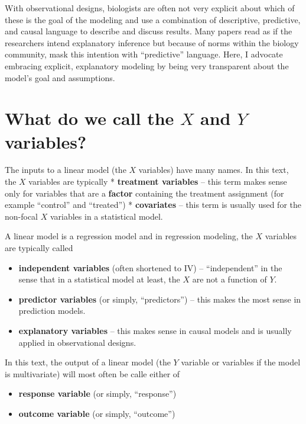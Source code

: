 \documentclass[]{book}
\providecommand{\tightlist}{%
  \setlength{\itemsep}{0pt}\setlength{\parskip}{0pt}}
\begin{document}
With observational designs, biologists are often not very explicit about which of these is the goal of the modeling and use a combination of descriptive, predictive, and causal language to describe and discuss results. Many papers read as if the researchers intend explanatory inference but because of norms within the biology community, mask this intention with ``predictive'' language. Here, I advocate embracing explicit, explanatory modeling by being very transparent about the model's goal and assumptions.

\hypertarget{what-do-we-call-the-x-and-y-variables}{%
\section{\texorpdfstring{What do we call the \(X\) and \(Y\) variables?}{What do we call the X and Y variables?}}\label{what-do-we-call-the-x-and-y-variables}}

The inputs to a linear model (the \(X\) variables) have many names. In this text, the \(X\) variables are typically
* \textbf{treatment variables} -- this term makes sense only for variables that are a \textbf{factor} containing the treatment assignment (for example ``control'' and ``treated'')
* \textbf{covariates} -- this term is usually used for the non-focal \(X\) variables in a statistical model.

A linear model is a regression model and in regression modeling, the \(X\) variables are typically called

\begin{itemize}
\tightlist
\item
  \textbf{independent variables} (often shortened to IV) -- ``independent'' in the sense that in a statistical model at least, the \(X\) are not a function of \(Y\).
\item
  \textbf{predictor variables} (or simply, ``predictors'') -- this makes the most sense in prediction models.
\item
  \textbf{explanatory variables} -- this makes sense in causal models and is usually applied in observational designs.
\end{itemize}

In this text, the output of a linear model (the \(Y\) variable or variables if the model is multivariate) will most often be calle either of

\begin{itemize}
\tightlist
\item
  \textbf{response variable} (or simply, ``response'')
\item
  \textbf{outcome variable} (or simply, ``outcome'')
\end{itemize}
\end{document}
